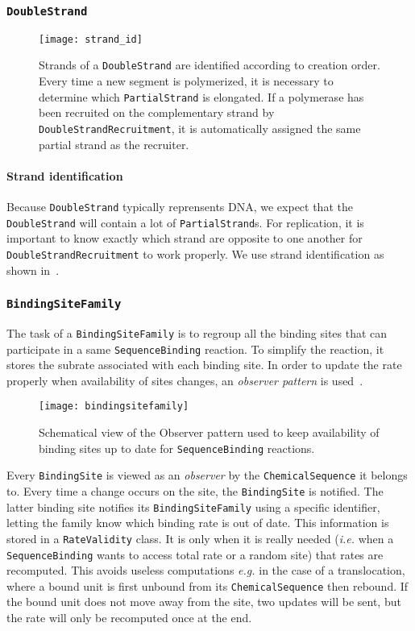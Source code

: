 \subsubsection{\texttt{DoubleStrand}}

\begin{figure}[!h]
  \centering
  \texttt{[image: strand\_id]}
  \caption{Strands of a \texttt{DoubleStrand} are identified according to creation order. Every time a new segment is polymerized, it is necessary to determine which \texttt{PartialStrand} is elongated. If a polymerase has been recruited on the complementary strand by \texttt{DoubleStrandRecruitment}, it is automatically assigned the same partial strand as the recruiter.}
  \label{fig:strand_id}
\end{figure}

\paragraph{Strand identification} Because \texttt{DoubleStrand} typically reprensents DNA, we expect that the \texttt{DoubleStrand} will contain a lot of \texttt{PartialStrand}s. For replication, it is important to know exactly which strand are opposite to one another for \texttt{DoubleStrandRecruitment} to work properly. We use strand identification as shown in~.


\subsubsection{\texttt{BindingSiteFamily}}

The task of a \texttt{BindingSiteFamily} is to regroup all the binding sites that can participate in a same \texttt{SequenceBinding} reaction. To simplify the reaction, it stores the subrate associated with each binding site. In order to update the rate properly when availability of sites changes, an \emph{observer pattern} is used~. 

\begin{figure}[!h]
  \centering
  \texttt{[image: bindingsitefamily]}
  \caption{Schematical view of the Observer pattern used to keep availability of binding sites up to date for \texttt{SequenceBinding} reactions.}
  \label{fig:det_bsf}
\end{figure}

Every \texttt{BindingSite} is viewed as an \emph{observer} by the \texttt{ChemicalSequence} it belongs to. Every time a change occurs on the site, the \texttt{BindingSite} is notified. The latter binding site notifies its \texttt{BindingSiteFamily} using a specific identifier, letting the family know which binding rate is out of date. This information is stored in a \texttt{RateValidity} class. It is only when it is really needed (\textit{i.e.} when a \texttt{SequenceBinding} wants to access total rate or a random site) that rates are recomputed. This avoids useless computations \textit{e.g.} in the case of a translocation, where a bound unit is first unbound from its \texttt{ChemicalSequence} then rebound. If the bound unit does not move away from the site, two updates will be sent, but the rate will only be recomputed once at the end.
